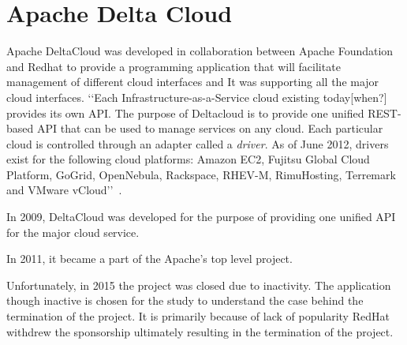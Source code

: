 \section{Apache Delta Cloud}

Apache DeltaCloud was developed in collaboration between Apache
Foundation and Redhat to provide a programming application that will
facilitate management of different cloud interfaces and It was
supporting all the major cloud interfaces.  ‘‘Each
Infrastructure-as-a-Service cloud existing today[when?] provides its
own API. The purpose of Deltacloud is to provide one unified
REST-based API that can be used to manage services on any cloud. Each
particular cloud is controlled through an adapter called a
\textit{driver}. As of June 2012, drivers exist for the following cloud
platforms: Amazon EC2, Fujitsu Global Cloud Platform, GoGrid,
OpenNebula, Rackspace, RHEV-M, RimuHosting, Terremark and VMware
vCloud’’~\cite{hid-sp18-417-wiki-deltacloud}.

In 2009, DeltaCloud was developed for the purpose of providing one
unified API for the major cloud service.

In 2011, it became a part of the Apache’s top level project. 

Unfortunately, in 2015 the project was closed due to inactivity.  The
application though inactive is chosen for the study to understand the
case behind the termination of the project.  It is primarily because
of lack of popularity RedHat withdrew the sponsorship ultimately
resulting in the termination of the project.
